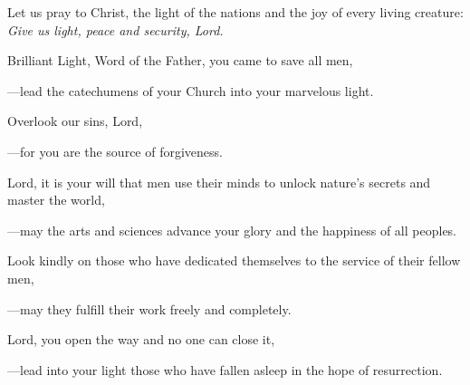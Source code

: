 \intercessions\indent

\begin{hangpar}

Let us pray to Christ, the light of the nations and the joy of every living creature:\\
\emph{Give us light, peace and security, Lord.}

\medskip Brilliant Light, Word of the Father, you came to save all men,

{\color{red}---\thinspace}lead the catechumens of your Church into your marvelous light.

\medskip Overlook our sins, Lord,

{\color{red}---\thinspace}for you are the source of forgiveness.

\medskip Lord, it is your will that men use their minds to unlock nature’s secrets and master the world,

{\color{red}---\thinspace}may the arts and sciences advance your glory and the happiness of all peoples.

\medskip Look kindly on those who have dedicated themselves to the service of their fellow men,

{\color{red}---\thinspace}may they fulfill their work freely and completely.

\medskip Lord, you open the way and no one can close it,

{\color{red}---\thinspace}lead into your light those who have fallen asleep in the hope of resurrection.

\end{hangpar}

